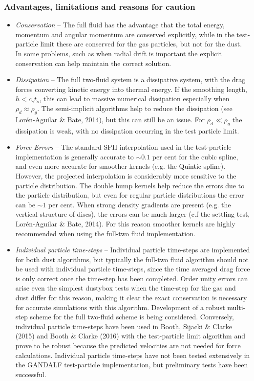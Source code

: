 \documentclass[a4paper]{article}
\begin{document}
\subsubsection{Advantages, limitations and reasons for caution}

\begin{itemize}
\item \emph{Conservation} -- The full fluid has the advantage that the total energy, momentum and angular momentum
are conserved explicitly, while in the test-particle limit these are conserved for the gas particles, but not for the dust. In some problems, such as when radial drift is important the explicit conservation can help maintain the correct solution.

\item \emph{Dissipation} -- The full two-fluid system is a dissipative system, with the drag forces converting kinetic energy into thermal energy. If the smoothing length, $h < c_s t_s$, this can lead to massive numerical dissipation especially when $\rho_d \approx \rho_g$. The semi-implicit algorithms help to reduce the dissipation (see Lor\'en-Aguilar \& Bate, 2014), but this can still be an issue. For $\rho_d \ll \rho_g$ the dissipation is weak, with no dissipation occurring in the test particle limit. 

\item \emph{Force Errors} -- The standard SPH interpolation used in the test-particle implementation is generally accurate to $\sim 0.1$ per cent for the cubic spline, and even more accurate for smoother kernels (e.g. the Quintic spline). However, the projected interpolation is considerably more sensitive to the particle distribution. The double hump kernels help reduce the errors due to the particle distribution, but even for regular particle distributions the error can be $\sim 1$ per cent. When strong density gradients are present (e.g. the vertical structure of discs), the errors can be much larger (c.f the settling test, Lor\'en-Aguilar \& Bate, 2014). For this reason smoother kernels are highly recommended when using the full-two fluid implementation. 

\item \emph{Individual particle time-steps} -- Individual particle time-steps are implemented for both dust algorithms, but typically the full-two fluid algorithm should not be used with individual particle time-steps, since the time averaged drag force is only correct once the time-step has been completed. Order unity errors can arise even the simplest dustybox tests when the time-step for the gas and dust differ for this reason, making it clear the exact conservation is necessary for accurate simulations with this algorithm. Development of a robust multi-step scheme for the full two-fluid scheme is being considered. Conversely, individual particle time-steps have been used in Booth, Sijacki \& Clarke (2015) and Booth \& Clarke (2016) with the test-particle limit algorithm and prove to be robust because the predicted velocities are not needed for force calculations. Individual particle time-steps have not been tested extensively in the GANDALF test-particle implementation, but preliminary tests have been successful.


\end{itemize}
\end{document}

